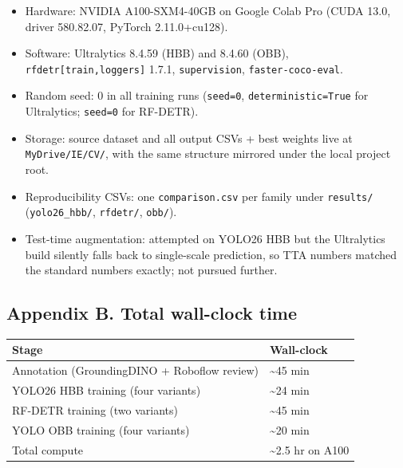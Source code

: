 \documentclass[11pt
]{article}
\newcounter{none} %
\providecommand{\tightlist}{%
  \setlength{\itemsep}{0pt}\setlength{\parskip}{0pt}}
\begin{document}
\begin{itemize}
\tightlist
\item
  Hardware: NVIDIA A100-SXM4-40GB on Google Colab Pro (CUDA 13.0, driver
  580.82.07, PyTorch 2.11.0+cu128).
\item
  Software: Ultralytics 8.4.59 (HBB) and 8.4.60 (OBB),
  \texttt{rfdetr{[}train,loggers{]}} 1.7.1, \texttt{supervision},
  \texttt{faster-coco-eval}.
\item
  Random seed: 0 in all training runs (\texttt{seed=0},
  \texttt{deterministic=True} for Ultralytics; \texttt{seed=0} for
  RF-DETR).
\item
  Storage: source dataset and all output CSVs + best weights live at
  \texttt{MyDrive/IE/CV/}, with the same structure mirrored under the
  local project root.
\item
  Reproducibility CSVs: one \texttt{comparison.csv} per family under
  \texttt{results/} (\texttt{yolo26\_hbb/}, \texttt{rfdetr/},
  \texttt{obb/}).
\item
  Test-time augmentation: attempted on YOLO26 HBB but the Ultralytics
  build silently falls back to single-scale prediction, so TTA numbers
  matched the standard numbers exactly; not pursued further.
\end{itemize}

\subsection{Appendix B. Total wall-clock
time}\label{appendix-b.-total-wall-clock-time}

{\def\LTcaptype{none} %
\begin{longtable}[]{@{}ll@{}}
\toprule\noalign{}
Stage & Wall-clock \\
\midrule\noalign{}
\endhead
\bottomrule\noalign{}
\endlastfoot
Annotation (GroundingDINO + Roboflow review) & \textasciitilde45 min \\
YOLO26 HBB training (four variants) & \textasciitilde24 min \\
RF-DETR training (two variants) & \textasciitilde45 min \\
YOLO OBB training (four variants) & \textasciitilde20 min \\
Total compute & \textasciitilde2.5 hr on A100 \\
\end{longtable}
}
\end{document}
